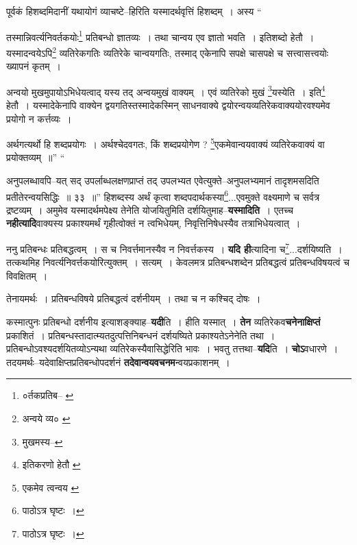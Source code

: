\documentclass[article,12pt,a4paper]{memoir}
\begin{document}
	  \pstart पूर्वकं हिशब्दमिदानीं यथायोगं व्याचष्टे--हिरिति यस्मादर्थवृत्तिं हिशब्दम् । अस्य  \leavevmode{} “
	  
	तस्मान्निवर्त्यनिवर्तकयोः\footnote{०र्तकप्रतिब--\cite{dp-msA} \cite{dp-msD} \cite{dp-edP} \cite{dp-edH} \cite{dp-edE}} प्रतिबन्धो ज्ञातव्यः । तथा चान्वय एव ज्ञातो भवति । इतिशब्दो हेतौ । यस्मादन्वयेऽपि\footnote{अन्वये व्य० \cite{dp-msA} \cite{dp-edP} \cite{dp-edH} \cite{dp-edE} \cite{dp-edN}} व्यतिरेकगतिः व्यतिरेके चान्वयगतिः, तस्माद् एकेनापि सपक्षे चासपक्षे च सत्त्वासत्त्वयोः ख्यापनं कृतम् । 
	  
	अन्वयो मुखमुपायोऽभिधेयत्वाद् यस्य तद् अन्वयमुखं वाक्यम् । एवं व्यतिरेको मुखं \footnote{मुखमस्य--\cite{dp-msC}}यस्येति । इति\footnote{इतिकरणो हेतौ \cite{dp-msA}} हेतौ । यस्मादेकेनापि वाक्येन द्वयगतिस्तस्मादेकस्मिन् साधनवाक्ये द्वयोरन्वयव्यतिरेकवाक्ययोरवश्यमेव प्रयोगो न कर्त्तव्यः । 
	  
	अर्थगत्यर्थो हि शब्दप्रयोगः । अर्थश्चेदवगतः, किं शब्दप्रयोगेण ? \footnote{एकमेव त्वन्वय \cite{dp-msA} \cite{dp-edP} \cite{dp-edH} \cite{dp-edE} \cite{dp-edN}}एकमेवान्वयवाक्यं व्यतिरेकवाक्यं वा प्रयोक्तव्यम् ॥” “
	  
	अनुपलब्धावपि--यत् सद् उपर्लाब्धलक्षणप्राप्तं तद् उपलभ्यत एवेत्युक्ते--अनुपलभ्यमानं तादृशमसदिति प्रतीतेरन्वयसिद्धिः ॥ ३३ ॥” हिशब्दस्य अर्थं कृत्वा शब्दपदार्थकस्या\footnote{पाठोऽत्र घृष्टः ।}...एवमुक्ते वक्ष्यमाणे च सर्वत्र द्रष्टव्यम् । अमुमेव यस्मादर्थमपेक्ष्य तेनेति योजयितुमिति दर्शयितुमाह--\textbf{यस्मादिति} । एतच्च \textbf{नहीत्यादि}वाक्यस्य प्रकाश्यमर्थं गृहीत्वोक्तं न त्वभिधेयम्, निवृत्तिनिषेधस्यैव तत्राभिधेयत्वात् ।
	\pend
      

	  \pstart ननु प्रतिबन्धः प्रतिबद्धत्वम् । स च निवर्त्तमानस्यैव न निवर्त्तकस्य । \textbf{यदि ही}त्यादिना च\footnote{पाठोऽत्र घृष्टः ।}...दर्शयिष्यति । तत्कथमिह निवर्त्यनिवर्त्तकयोरित्युक्तम् । सत्यम् । केवलमत्र प्रतिबन्धशब्देन प्रतिबद्धत्वं प्रतिबन्धविषयत्वं च विवक्षितम् ।
	\pend
      

	  \pstart तेनायमर्थः । प्रतिबन्धविषये प्रतिबद्धत्वं दर्शनीयम् । तथा च न कश्चिद् दोषः ।
	\pend
      

	  \pstart कस्मात्पुनः प्रतिबन्धो दर्शनीय इत्याशङ्क्याह--\textbf{यदी}ति । हीति यस्मात् । \textbf{तेन} व्यतिरेकव\textbf{चनेनाक्षिप्तं} प्रकाशितं । प्रतिबन्धस्तादात्म्यतदुत्पत्तिनिबन्धनं दर्शयष्यिते प्रकाश्यतेऽनेनेति तथा । प्रतिबन्धोऽवश्यदर्शयितव्योऽन्यथा व्यतिरेकस्यैवासिद्धेरिति भावः । भवतु तत्तथा--\textbf{यदि}ति । \textbf{चोऽ}वधारणे । तदयमर्थः--यदेवाक्षिप्तप्रतिबन्धोपदर्शनं \textbf{तदेवान्वयवचनम}न्वयप्रकाशनम् ।
	\pend
      
\end{document}
